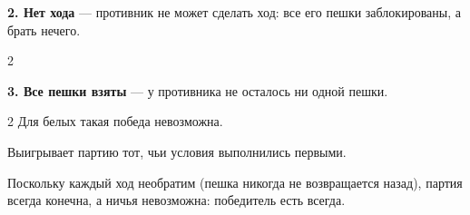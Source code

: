 \documentclass[12pt,a4paper]{article}
\begin{document}
\textbf{2. Нет хода} --- противник не может сделать ход: все его пешки заблокированы, а брать нечего.
\begin{center}
\begin{multicols}{2}
\columnbreak \par
{} %
\end{multicols}
\end{center}

\textbf{3. Все пешки взяты} --- у противника не осталось ни одной пешки.
\begin{center}
\begin{multicols}{2}
Для белых такая победа невозможна.
\columnbreak \par
{} %
\end{multicols}
\end{center}

Выигрывает партию тот, чьи условия выполнились первыми.

Поскольку каждый ход необратим (пешка никогда не возвращается назад), партия всегда конечна, а ничья невозможна:
победитель есть всегда.
\end{document}
